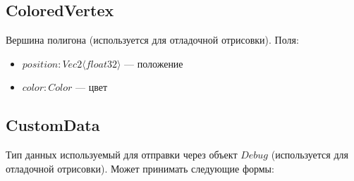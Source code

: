 \subsection{ColoredVertex}
Вершина полигона (используется для отладочной отрисовки). Поля:
\begin{itemize}
    \item $position : Vec2 \langle float32 \rangle$ --- положение
    \item $color : Color$ --- цвет
\end{itemize}

\subsection{CustomData}
Тип данных используемый для отправки через объект $Debug$ (используется для отладочной отрисовки).
Может принимать следующие формы:
